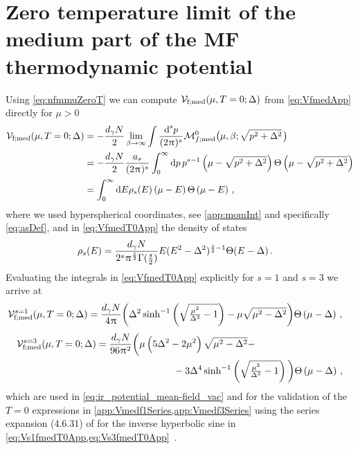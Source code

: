 \section{Zero temperature limit of the medium part of the MF thermodynamic potential}\label{app:zeroT}
Using \cref{eq:nfmmuZeroT} we can compute $\mathcal{V}_{\mathrm{f};\med}(\muT[\mu][T=0];\Delta)$ from \cref{eq:VfmedApp} directly for $\mu>0$
\begin{align}
	\mathcal{V}_{\mathrm{f};\med}(\muT[\mu][T=0];\Delta) &= -\frac{d_\gamma N}{2}\lim_{\beta\rightarrow\infty}\int\frac{\dif^{\,s}\! p}{(2\piu)^s}\mathcal{M}_{f;\med}^0\big(\mu,\beta;\sqrt{p^2+\Delta^2}\mkern2mu\big)\\[.1em]
	&=-\frac{d_\gamma N}{2} \frac{a_s}{(2\piu)^s} \int_0^\infty\dif p \, p^{s-1}\del{\mu-\sqrt{p^2+\Delta^2}} \Theta\del{\mu-\sqrt{p^2+\Delta^2}}\\[.1em]
	&=\int_0^\infty\dif E \rho_s(E)\del{\mu-E} \Theta\del{\mu-E}\,,\label{eq:VfmedT0App}
\end{align}
where we used hyperspherical coordinates, see \cref{app:momInt} and specifically \cref{eq:asDef}, and in \cref{eq:VfmedT0App} the density of states
\begin{align}
	\rho_s(E)&=\frac{d_\gamma N}{2^s \mkern1.0mu\uppi\mkern1.0mu^\frac{s}{2} \Gamma(\frac{s}{2})}E(E^2-\Delta^2)^{\frac{s}{2}-1}\Theta(E-\Delta)\,.\label{eq:rhoVfmedT0App}
\end{align}
Evaluating the integrals in \cref{eq:VfmedT0App} explicitly for $s=1$ and $s=3$ we arrive at
\begin{align}
	\mathcal{V}_{\mathrm{f};\med}^{s=1}(\muT[\mu][T=0];\Delta) &=  \frac{d_\gamma N}{4\piu}\bigg(\Delta ^2 \sinh ^{-1}\left(\sqrt{\tfrac{\mu ^2}{\Delta ^2}-1}\right)-\mu  \sqrt{\mu ^2-\Delta ^2}\bigg)\Theta\del{\mu-\Delta}\, ,\label{eq:Vs1fmedT0App}
\end{align}
\begin{align}
	\mathcal{V}_{\mathrm{f};\med}^{s=3}(\muT[\mu][T=0];\Delta) &= \frac{d_\gamma N}{96\piu^2}\bigg(\mu  \left(5 \Delta ^2-2 \mu ^2\right) \sqrt{\mu ^2-\Delta ^2}-\notag\\
	&\qquad\qquad\qquad\qquad - 3 \Delta ^4 \sinh ^{-1}\left(\sqrt{\tfrac{\mu ^2}{\Delta ^2}-1}\right)\bigg)\Theta\del{\mu-\Delta}\, ,\label{eq:Vs3fmedT0App}
\end{align}
which are used in \cref{eq:ir_potential_mean-field_vac} and for the validation of the $T=0$ expressions in \cref{app:Vmedf1Series,app:Vmedf3Series} using the series expansion (4.6.31) of  for the inverse hyperbolic sine in \cref{eq:Vs1fmedT0App,eq:Vs3fmedT0App}~\cite{Steil:2023PhDThermodynamicsNB}.
